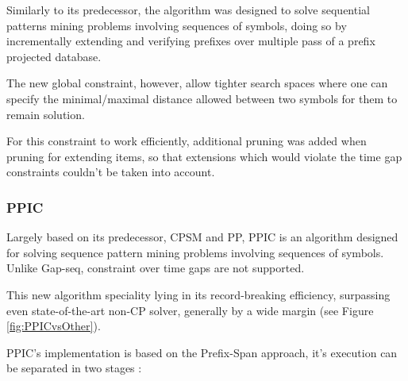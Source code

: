 \documentclass{eplmastersthesis}
\begin{document}
Similarly to its predecessor, the algorithm was designed to solve sequential patterns mining problems involving sequences of symbols, doing so by incrementally extending and verifying prefixes over multiple pass of a prefix projected database. \newline

The new global constraint, however, allow tighter search spaces where one can specify the minimal/maximal distance allowed between two symbols for them to remain solution. \newline

For this constraint to work efficiently, additional pruning was added when pruning for extending items, so that extensions which would violate the time gap constraints couldn't be taken into account.

\subsubsection{PPIC}

Largely based on its predecessor, CPSM and PP, PPIC is an algorithm designed for solving sequence pattern mining problems involving sequences of symbols. Unlike Gap-seq, constraint over time gaps are not supported. \newline

This new algorithm speciality lying in its record-breaking efficiency, surpassing even state-of-the-art non-CP solver, generally by a wide margin (see Figure \ref{fig:PPICvsOther}).

PPIC's implementation is based on the Prefix-Span approach, it's execution can be separated in two stages :
\end{document}
